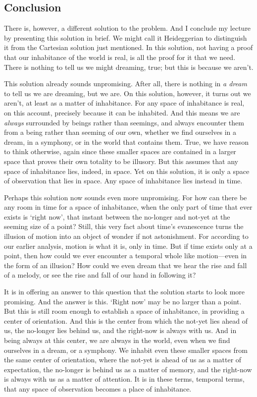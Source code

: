 \documentclass[12pt]{memoir}
\begin{document}
\subsection{Conclusion}

There is, however, a different solution to the problem. And I conclude
my lecture by presenting this solution in brief. We might call it
Heideggerian to distinguish it from the Cartesian solution just
mentioned. In this solution, not having a proof that our inhabitance of
the world is real, is all the proof for it that we need. There is
nothing to tell us we might dreaming, true; but this is because we
aren't.

This solution already sounds unpromising. After all, there is nothing in
\emph{a dream} to tell us we are dreaming, but we are. On this solution,
however, it turns out we aren't, at least as a matter of inhabitance.
For any space of inhabitance is real, on this account, precisely because
it can be inhabited. And this means we are \emph{always} surrounded by
beings rather than seemings, and always encounter them from a being
rather than seeming of our own, whether we find ourselves in a dream, in
a symphony, or in the world that contains them. True, we have reason to
think otherwise, again since these smaller spaces are contained in a
larger space that proves their own totality to be illusory. But this
assumes that any space of inhabitance lies, indeed, in space. Yet on
this solution, it is only a space of observation that lies in space. Any
space of inhabitance lies instead in time.

Perhaps this solution now sounds even more unpromising. For how can
there be any room in time for a space of inhabitance, when the only part
of time that ever exists is `right now', that instant between the
no-longer and not-yet at the seeming size of a point? Still, this very
fact about time's evanescence turns the illusion of motion into an
object of wonder if not astonishment. For according to our earlier
analysis, motion is what it is, only in time. But if time exists only at
a point, then how could we ever encounter a temporal whole like
motion---even in the form of an illusion? How could we even dream that
we hear the rise and fall of a melody, or see the rise and fall of our
hand in following it?

It is in offering an answer to this question that the solution starts to
look more promising. And the answer is this. `Right now' may be no
larger than a point. But this is still room enough to establish a space
of inhabitance, in providing a center of orientation. And this is the
center from which the not-yet lies ahead of us, the no-longer lies
behind us, and the right-now is always with us. And in being always at
this center, we are always in the world, even when we find ourselves in
a dream, or a symphony. We inhabit even these smaller spaces from the
same center of orientation, where the not-yet is ahead of us as a matter
of expectation, the no-longer is behind us as a matter of memory, and
the right-now is always with us as a matter of attention. It is in these
terms, temporal terms, that any space of observation becomes a place of
inhabitance.
\end{document}
